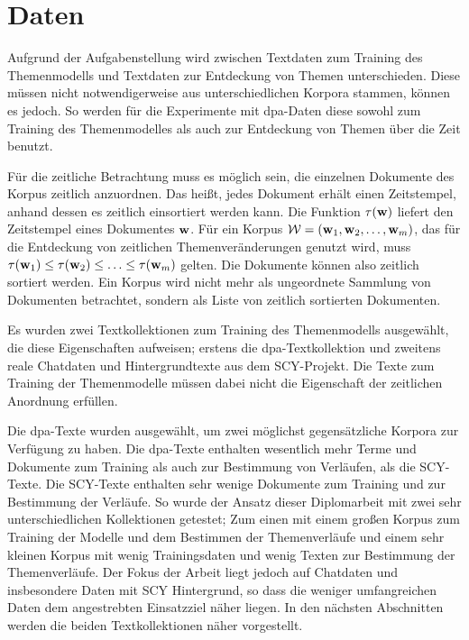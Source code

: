 \section{Daten}

Aufgrund der Aufgabenstellung wird zwischen Textdaten zum Training des Themenmodells und Textdaten zur Entdeckung von Themen unterschieden. Diese müssen nicht notwendigerweise aus unterschiedlichen Korpora stammen, können es jedoch. So werden für die Experimente mit dpa-Daten diese sowohl zum Training des Themenmodelles als auch zur Entdeckung von Themen über die Zeit benutzt. 

Für die zeitliche Betrachtung muss es möglich sein, die einzelnen Dokumente des Korpus zeitlich anzuordnen. Das heißt, jedes Dokument erhält einen Zeitstempel, anhand dessen es zeitlich einsortiert werden kann. Die Funktion $\tau(\mathbf{w})$ liefert den Zeitstempel eines Dokumentes $\mathbf{w}$. Für ein Korpus $\mathcal{W}=(\mathbf{w}_1,\mathbf{w}_2,\ldots,\mathbf{w}_m)$, das für die Entdeckung von zeitlichen Themenveränderungen genutzt wird, muss  $\tau(\mathbf{w}_1) \leq \tau(\mathbf{w}_2) \leq \ldots \leq \tau(\mathbf{w}_m)$ gelten. Die Dokumente können also zeitlich sortiert werden. Ein Korpus wird nicht mehr als ungeordnete Sammlung von Dokumenten betrachtet, sondern als Liste von zeitlich sortierten Dokumenten. 

Es wurden zwei Textkollektionen zum Training des Themenmodells ausgewählt, die diese Eigenschaften aufweisen; erstens die dpa-Textkollektion und zweitens reale Chatdaten und Hintergrundtexte aus dem SCY-Projekt. Die Texte  zum Training der Themenmodelle müssen dabei nicht die Eigenschaft der zeitlichen Anordnung erfüllen.

Die dpa-Texte wurden ausgewählt, um zwei möglichst gegensätzliche Korpora zur Verfügung zu haben. Die dpa-Texte enthalten wesentlich mehr Terme und Dokumente zum Training als auch zur Bestimmung von Verläufen, als die SCY-Texte. Die SCY-Texte enthalten sehr wenige Dokumente zum Training und zur Bestimmung der Verläufe. So wurde der Ansatz dieser Diplomarbeit mit zwei sehr unterschiedlichen Kollektionen getestet; Zum einen mit einem großen Korpus zum Training der Modelle und dem Bestimmen der Themenverläufe und einem sehr kleinen Korpus mit wenig Trainingsdaten und wenig Texten zur Bestimmung der Themenverläufe. Der Fokus der Arbeit liegt jedoch auf Chatdaten und insbesondere Daten mit SCY Hintergrund, so dass die weniger umfangreichen Daten dem angestrebten Einsatzziel näher liegen. In den nächsten Abschnitten werden die beiden Textkollektionen näher vorgestellt. 

